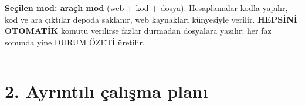 \endgroup

\textbf{Seçilen mod: araçlı mod} (web + kod + dosya). Hesaplamalar kodla yapılır, kod ve ara çıktılar depoda saklanır, web kaynakları künyesiyle verilir. \textbf{HEPSİNİ OTOMATİK} komutu verilirse fazlar durmadan dosyalara yazılır; her faz sonunda yine DURUM ÖZETİ üretilir.

\begin{center}\rule{0.5\linewidth}{0.5pt}\end{center}

\hypertarget{00_plan-2-ayrux131ntux131lux131-uxe7alux131ux15fma-planux131}{%
\section{2. Ayrıntılı çalışma planı}\label{00_plan-2-ayrux131ntux131lux131-uxe7alux131ux15fma-planux131}}

\begingroup\gbtablo\footnotesize


